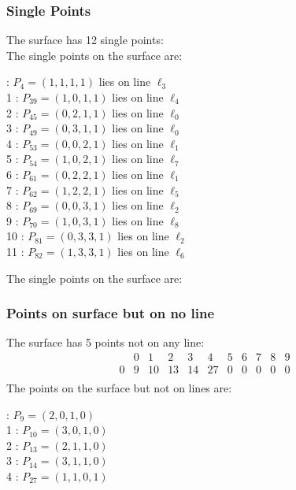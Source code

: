 \documentclass{article}
\begin{document}
{\subsubsection*{Single Points}
The surface has 12 single points:\\
The single points on the surface are:\\
\begin{multicols}{2}
 : $P_{4}=( 1, 1, 1, 1 )$ lies on line $\ell_{3}$\\
1 : $P_{39}=( 1, 0, 1, 1 )$ lies on line $\ell_{4}$\\
2 : $P_{45}=( 0, 2, 1, 1 )$ lies on line $\ell_{0}$\\
3 : $P_{49}=( 0, 3, 1, 1 )$ lies on line $\ell_{0}$\\
4 : $P_{53}=( 0, 0, 2, 1 )$ lies on line $\ell_{1}$\\
5 : $P_{54}=( 1, 0, 2, 1 )$ lies on line $\ell_{7}$\\
6 : $P_{61}=( 0, 2, 2, 1 )$ lies on line $\ell_{1}$\\
7 : $P_{62}=( 1, 2, 2, 1 )$ lies on line $\ell_{5}$\\
8 : $P_{69}=( 0, 0, 3, 1 )$ lies on line $\ell_{2}$\\
9 : $P_{70}=( 1, 0, 3, 1 )$ lies on line $\ell_{8}$\\
10 : $P_{81}=( 0, 3, 3, 1 )$ lies on line $\ell_{2}$\\
11 : $P_{82}=( 1, 3, 3, 1 )$ lies on line $\ell_{6}$\\
\end{multicols}
The single points on the surface are:\\
\subsubsection*{Points on surface but on no line}
The surface has 5 points not on any line:\\
$$
\begin{array}{r|*{10}{r}}
 & 0 & 1 & 2 & 3 & 4 & 5 & 6 & 7 & 8 & 9\\
\hline
0 & 9 & 10 & 13 & 14 & 27 & 0 & 0 & 0 & 0 & 0\\
\end{array}
$$
The points on the surface but not on lines are:\\
\begin{multicols}{2}
 : $P_{9}=( 2, 0, 1, 0 )$\\
1 : $P_{10}=( 3, 0, 1, 0 )$\\
2 : $P_{13}=( 2, 1, 1, 0 )$\\
3 : $P_{14}=( 3, 1, 1, 0 )$\\
4 : $P_{27}=( 1, 1, 0, 1 )$\\
\end{multicols}
}
\end{document}
